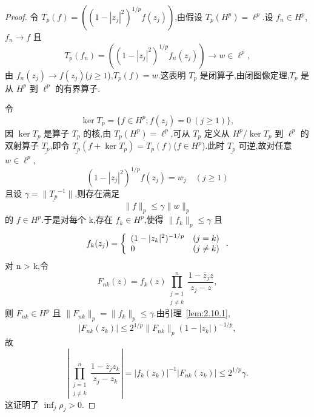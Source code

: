 \begin{proof}
令 $T_{p}(f) = ((1 - |z_{j}|^{2})^{1/p}f(z_{j}))$,由假设 $T_{p}(H^{p}) = \ell^{p}$.设 $f_{n} \in H^{p}$,$f_{n} \to f$ 且
\begin{equation*}
T_{p}(f_{n}) = ((1 - |z_{j}|^{2})^{1/p}f_{n}(z_{j})) \to w \in \ell^{p},
\end{equation*}
由 $f_{n}(z_{j}) \to f(z_{j})$($j \geq 1$),$T_{p}(f) = w$.这表明 $T_{p}$ 是闭算子,由闭图像定理,$T_{p}$ 是从 $H^{p}$ 到 $\ell^{p}$ 的有界算子.

令
\begin{equation*}
\ker T_{p} = \{f \in H^{p}; f(z_{j}) = 0 \ (j \geq 1)\},
\end{equation*}
因 $\ker T_{p}$ 是算子 $T_{p}$ 的核,由 $T_{p}(H^{p}) = \ell^{p}$,可从 $T_{p}$ 定义从 $H^{p}/\ker T_{p}$ 到 $\ell^{p}$ 的双射算子 $\underline{T_{p}}$,即令 $\underline{T_{p}}(f + \ker T_{p}) = T_{p}(f)$($f \in H^{p}$).此时 $\underline{T_{p}}$ 可逆,故对任意 $w \in \ell^{p}$,
\begin{equation*}
(1 - |z_{j}|^{2})^{1/p}f(z_{j}) = w_{j} \quad (j \geq 1)
\end{equation*}
且设 $\gamma = \|\underline{T_{p}}^{-1}\|$,则存在满足
\begin{equation*}
\|f\|_{p} \leq \gamma\|w\|_{p}
\end{equation*}
的 $f \in H^{p}$.于是对每个 k,存在 $f_{k} \in H^{p}$,使得 $\|f_{k}\|_{p} \leq \gamma$ 且
\begin{equation*}
f_{k}(z_{j}) = \left\{ \begin{array}{l l}
(1 - |z_{k}|^{2})^{-1/p} & (j = k) \\
0 & (j \neq k)
\end{array} \right..
\end{equation*}
对 n > k,令
\begin{equation*}
F_{nk}(z) = f_{k}(z)\prod_{\substack{j=1\\ j\neq k}}^{n}\frac{1 - \bar{z}_{j}z}{z_{j} - z},
\end{equation*}
则 $F_{nk} \in H^{p}$ 且 $\|F_{nk}\|_{p} = \|f_{k}\|_{p} \leq \gamma$.由引理~\ref{lem:2.10.1},
\begin{equation*}
|F_{nk}(z_{k})| \leq 2^{1/p}\|F_{nk}\|_{p}(1 - |z_{k}|)^{-1/p},
\end{equation*}
故
\begin{equation*}
\left|\prod_{\substack{j=1\\ j\neq k}}^{n}\frac{1 - \bar{z}_{j}z_{k}}{z_{j} - z_{k}}\right| = |f_{k}(z_{k})|^{-1}|F_{nk}(z_{k})| \leq 2^{1/p}\gamma.
\end{equation*}
这证明了 $\inf_{j}\rho_{j} > 0$.
\end{proof}

